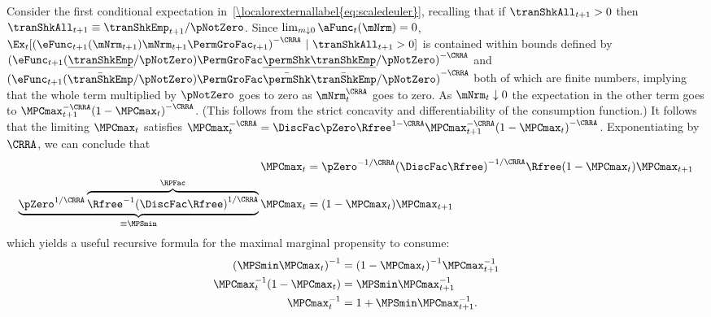 \documentclass[\econtexRoot/BufferStockTheory]{subfiles}
\begin{document}
Consider the first conditional expectation in~\eqref{\localorexternallabel{eq:scaledeuler}},
recalling that if $\tranShkAll_{t+1}>0$ then $\tranShkAll_{t+1} \equiv
\tranShkEmp_{t+1}/\pNotZero$.  Since $\lim_{m \downarrow 0}
\aFunc_{t}(\mNrm) = 0$,
$\Ex_{t}[{(\eFunc_{t+1}(\mNrm_{t+1})\mNrm_{t+1}\PermGroFac_{t+1})}^{-\CRRA}~|~\tranShkAll_{t+1}>0]$
is contained within bounds defined by
${(\eFunc_{t+1}(\underline{\tranShkEmp}/\pNotZero) \PermGroFac\underline{\permShk}
\underline{\tranShkEmp}/\pNotZero)}^{-\CRRA}$ and
${(\eFunc_{t+1}(\bar{\tranShkEmp}/\pNotZero) \PermGroFac\bar{\permShk}
\bar{\tranShkEmp}/\pNotZero)}^{-\CRRA}$ both of which are finite numbers,
implying that the whole term multiplied by $\pNotZero$ goes to zero as
$\mNrm_{t}^{\CRRA}$ goes to zero.  As $\mNrm_{t} \downarrow 0$ the
expectation in the other term goes to $\MPCmax _{t+1}^{-\CRRA
}{(1-\MPCmax _{t})}^{-\CRRA }$. (This follows from the strict concavity
and differentiability of the consumption function.) It follows that
the limiting $\MPCmax_{t}$ satisfies $\MPCmax_{t}^{-\CRRA }=\DiscFac
\pZero\Rfree^{1-\CRRA }\MPCmax_{t+1}^{-\CRRA }{(1-\MPCmax
_{t})}^{-\CRRA }$. Exponentiating by $\CRRA$, we can conclude that
\begin{equation}\begin{gathered}\begin{aligned}
\MPCmax_{t} & = \pZero^{-1/\CRRA} {(\DiscFac
\Rfree)}^{-1/\CRRA}\Rfree(1-\MPCmax _{t})\MPCmax _{t+1} \notag
\\ \underbrace{\pZero^{1/\CRRA}\overbrace{{\Rfree}^{-1}{(\DiscFac
    \Rfree)}^{1/\CRRA}}^{\RPFac}}_{\equiv \MPSmin}
\MPCmax_{t} & = (1-\MPCmax _{t})\MPCmax _{t+1} \label{eq:MPSminDef}
\end{aligned}\end{gathered}\end{equation}
which yields a useful recursive formula for the maximal marginal propensity to consume:
\begin{equation}\begin{gathered}\begin{aligned}
  {(\MPSmin \MPCmax_{t})}^{-1}  & = {(1-\MPCmax_{t})}^{-1}\MPCmax_{t+1}^{-1}  \notag
\\ \MPCmax_{t}^{-1}(1-\MPCmax_{t})  & = \MPSmin \MPCmax_{t+1}^{-1}   \notag
\\ \MPCmax_{t}^{-1}  & = 1+\MPSmin \MPCmax_{t+1}^{-1} \label{eq:MPCmaxInvApndx}.
\end{aligned}\end{gathered}\end{equation}
\end{document}
